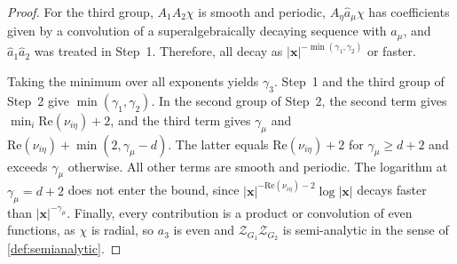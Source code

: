 \documentclass[10pt,a4paper]{amsart}
\begin{document}
\begin{proof}
For the third group, $A_1A_2\chi$ is smooth and periodic, $A_\eta \hat a_\mu\chi$ has
coefficients given by a convolution of a superalgebraically decaying sequence with
$a_\mu$, and $\hat a_1 \hat a_2$ was treated in Step~1. Therefore, all decay as
$|\bm x|^{-\min(\gamma_1,\gamma_2)}$ or faster.

Taking the minimum over all exponents yields $\gamma_3$. Step~1 and the third group of Step~2 give $\min(\gamma_1,\gamma_2)$. In the second group of Step~2, the second term gives $\min_i\mathrm{Re}(\nu_{i\eta})+2$, and the third term gives $\gamma_\mu$ and $\mathrm{Re}(\nu_{i\eta})+\min(2,\gamma_\mu-d)$. The latter equals $\mathrm{Re}(\nu_{i\eta})+2$ for $\gamma_\mu\ge d+2$ and exceeds $\gamma_\mu$ otherwise. All other terms are smooth and periodic. The logarithm at $\gamma_\mu=d+2$ does not enter the bound, since $|\bm x|^{-\mathrm{Re}(\nu_{i\eta})-2}\log|\bm x|$ decays faster than $|\bm x|^{-\gamma_\mu}$.
Finally, every contribution is a product or convolution of even functions, as $\chi$ is radial, so $a_3$ is even and $\mathcal Z_{G_1}\mathcal Z_{G_2}$ is semi-analytic in the sense of \cref{def:semianalytic}.
\end{proof}
\end{document}
